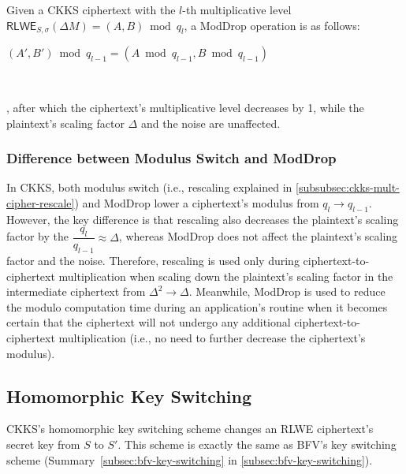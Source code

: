 \begin{tcolorbox}[title={\textbf{\tboxlabel{\ref*{subsec:ckks-moddrop}} CKKS's \textsf{ModDrop}}}]

Given a CKKS ciphertext with the $l$-th multiplicative level $\textsf{RLWE}_{S, \sigma}(\Delta M) = (A, B) \bmod q_l$, a \textsf{ModDrop} operation is as follows: 

$(A', B') \bmod q_{l-1} = (A \bmod q_{l-1}, B \bmod q_{l-1})$

$ $

, after which the ciphertext's multiplicative level decreases by 1, while the plaintext's scaling factor $\Delta$ and the noise are unaffected. 

\end{tcolorbox}

\subsubsection{Difference between Modulus Switch and \textsf{ModDrop}}
\label{subsubsec:ckks-moddrop-vs-modswitch}

In CKKS, both modulus switch (i.e., rescaling explained in \autoref{subsubsec:ckks-mult-cipher-rescale}) and \textsf{ModDrop} lower a ciphertext's modulus from $q_l \rightarrow q_{l-1}$. However, the key difference is that rescaling also decreases the plaintext's scaling factor by the $\dfrac{q_l}{q_{l-1}} \approx \Delta$, whereas \textsf{ModDrop} does not affect the plaintext's scaling factor and the noise. Therefore, rescaling is used only during ciphertext-to-ciphertext multiplication when scaling down the plaintext's scaling factor in the intermediate ciphertext from $\Delta^2 \rightarrow \Delta$. Meanwhile, \textsf{ModDrop} is used to reduce the modulo computation time during an application's routine when it becomes certain that the ciphertext will not undergo any additional ciphertext-to-ciphertext multiplication (i.e., no need to further decrease the ciphertext's modulus). 



\subsection{Homomorphic Key Switching}
\label{subsec:ckks-key-switching}

CKKS's homomorphic key switching scheme changes an RLWE ciphertext's secret key from $S$ to $S'$. This scheme is exactly the same as BFV's key switching scheme (Summary~\ref*{subsec:bfv-key-switching} in \autoref{subsec:bfv-key-switching}).



